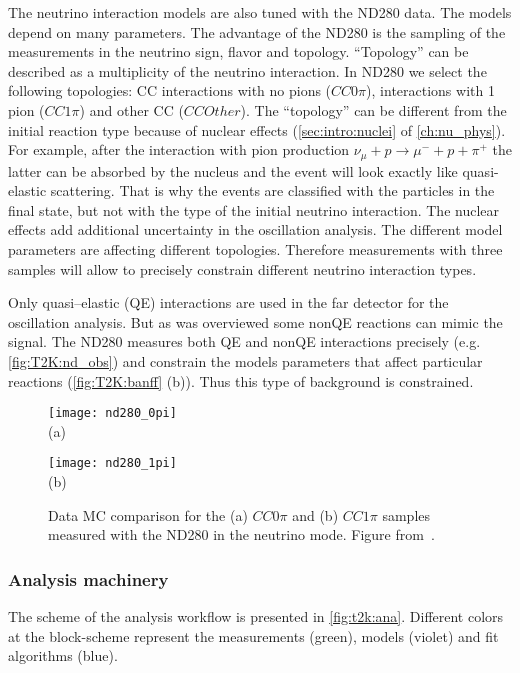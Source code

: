 \documentclass[../main.tex]{subfiles}
\begin{document}
The neutrino interaction models are also tuned with the ND280 data. The models depend on many parameters. The advantage of the ND280 is the sampling of the measurements in the neutrino sign, flavor and topology. ``Topology'' can be described as a multiplicity of the neutrino interaction. In ND280 we select the following topologies: CC interactions with no pions ($CC0\pi$), interactions with 1 pion ($CC1\pi$) and other CC ($CCOther$). The ``topology'' can be different from the initial reaction type because of nuclear effects (\autoref{sec:intro:nuclei} of \autoref{ch:nu_phys}). For example, after the interaction with pion production $\nu_\mu+p\to\mu^-+p+\pi^+$ the latter can be absorbed by the nucleus and the event will look exactly like quasi-elastic scattering. That is why the events are classified with the particles in the final state, but not with the type of the initial neutrino interaction. The nuclear effects add additional uncertainty in the oscillation analysis. The different model parameters are affecting different topologies. Therefore measurements with three samples will allow to precisely constrain different neutrino interaction types.

Only quasi--elastic (QE) interactions are used in the far detector for the oscillation analysis. But as was overviewed some nonQE reactions can mimic the signal. The ND280 measures both QE and nonQE interactions precisely (e.g. \autoref{fig:T2K:nd_obs}) and constrain the models parameters that affect particular reactions (\autoref{fig:T2K:banff} (b)). Thus this type of background is constrained.

\begin{figure}[!ht]
  \centering
  \begin{minipage}{0.49\linewidth}
    \centering
    \texttt{[image: nd280\_0pi]} \\ (a)
  \end{minipage}
  \begin{minipage}{0.49\linewidth}
    \centering
    \texttt{[image: nd280\_1pi]} \\ (b)
  \end{minipage}
    \caption{Data MC comparison for the (a) $CC0\pi$ and (b) $CC1\pi$ samples measured with the ND280 in the neutrino mode. Figure from~\cite{Abe2017}.}
    \label{fig:T2K:nd_obs}
\end{figure}

\subsubsection{Analysis machinery}
The scheme of the analysis workflow is presented in \autoref{fig:t2k:ana}. Different colors at the block-scheme represent the measurements (green), models (violet) and fit algorithms (blue).
\end{document}
